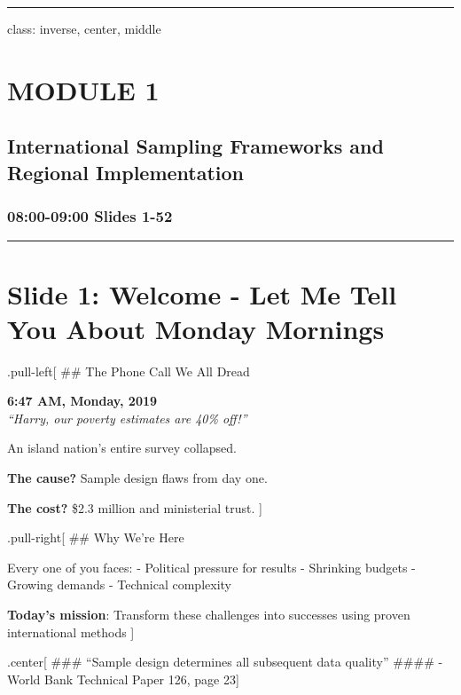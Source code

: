 \documentclass[
]{article}
\begin{document}
\begin{center}\rule{0.5\linewidth}{0.5pt}\end{center}

class: inverse, center, middle

\section{MODULE 1}\label{module-1}

\subsection{International Sampling Frameworks and Regional
Implementation}\label{international-sampling-frameworks-and-regional-implementation}

\subsubsection{08:00-09:00 \textbar{} Slides 1-52}\label{slides-1-52}

\begin{center}\rule{0.5\linewidth}{0.5pt}\end{center}

\section{Slide 1: Welcome - Let Me Tell You About Monday
Mornings}\label{slide-1-welcome---let-me-tell-you-about-monday-mornings}

.pull-left{[} \#\# The Phone Call We All Dread

\textbf{6:47 AM, Monday, 2019}\\
\emph{``Harry, our poverty estimates are 40\% off!''}

An island nation's entire survey collapsed.

\textbf{The cause?} Sample design flaws from day one.

\textbf{The cost?} \$2.3 million and ministerial trust. {]}

.pull-right{[} \#\# Why We're Here

Every one of you faces: - Political pressure for results - Shrinking
budgets - Growing demands - Technical complexity

\textbf{Today's mission}: Transform these challenges into successes
using proven international methods {]}

.center{[} \#\#\# ``Sample design determines all subsequent data
quality'' \#\#\#\# - World Bank Technical Paper 126, page 23{]}
\end{document}
